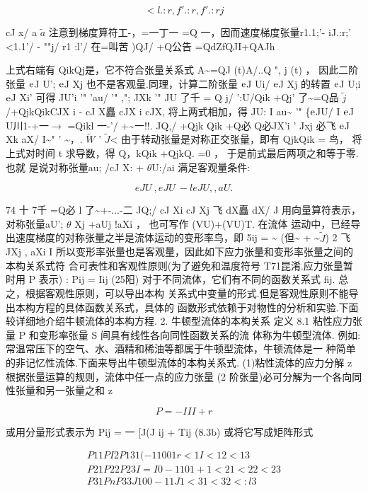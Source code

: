 \[<l.:r, f'.:r, f'.:rj\]

cJ x/ a $\tilde{a}$ 注意到梯度算符工-，=一丁一 =Q 一，因而速度梯度张量r1.1;'- iJ.:r;' <1.1'/ - ""j/ r1 :l'/ 在=叫苦 )QJ/ +Q公告 =QdZfQJI+QAJh

上式右端有 QikQj是，它不符合张量关系式 A\textasciitilde{}=QJ (t)A/..Q ", j (t) ， 因此二阶张量 ${\rm e}$J U'; ${\rm e}$J Xj 也不是客观量.同理，计算二阶张量 ${\rm e}$J Ui/ ${\rm e}$J Xj 的转置 ${\rm e}$J U;i${\rm e}$J Xi' 可得 JU'i '" 'au/ '" ,"; JXk '" JU 了千 = Q j/ ':U/Qik +Qj' 了\textasciitilde{}=Q品 $\tilde{j}$/+QjkQikCJX i - cJ X矗 cJX i cJX, 将上两式相加，得 JU: I au\textasciitilde{} '" \{${\rm e}$JU/ I ${\rm e}$J U川1-+一$\rightarrow$ =Qikl 一-'/ +\textasciitilde{}一!!. JQ,/ +Qjk Qik +Q必 Q必JX'i ' Jxj 必飞 ${\rm e}$J Xk aX/ I\textasciitilde{}" ' \textasciitilde{}，. $\tilde{W}$ ' $\tilde{J}$< 由于转动张量是对称正交张量，即有 QjkQik = 鸟， 将上式对时间 t 求导数，得 Q，kQik +QjkQ. =0 ， 于是前式最后两项之和等于零.也就 是说对称张量au; /cJ X: + $\theta$U:/ai 满足客观量条件:

\[eJ U~ , eJ U~ - l eJU , , aU.  \]

74 十 7千 =Q必 l 了\textasciitilde{}+-...-二 JQ;/ cJ Xi cJ Xj 飞 dX矗 dX/ J 用向量算符表示，对称张量aU'; $\theta$ Xj +aUj !aXi ， 也可写作 (VU)+(VU)T. 在流体 运动中，已经导出速度梯度的对称张量之半是流体运动的变形率鸟，即 5ij = \textasciitilde{} (但\textasciitilde{} + \textasciitilde{}$\tilde{J}$) 2 飞 JXj , aXi I 所以变形率张量也是客观量，因此如下应力张量和变形率张量之间的本构关系式符 合可表性和客观性原则(为了避免和温度符号 T71昆淆.应力张量暂时用 P 表示) : Pij = Iij (25阳) 对于不同流体，它们有不同的函数关系式 fij. 总之，根据客观性原则，可以导出本构 关系式中变量的形式.但是客观性原则不能导出本构方程的具体函数关系式，具体的 函数形式依赖于对物性的分析和实验.下面较详细地介绍牛顿流体的本构方程. 2. 牛顿型流体的本构关系 定义 8.1 粘性应力张量 P 和变形率张量 S 间具有线性各向同性函数关系的流 体称为牛顿型流体. 例如:常温常压下的空气、水、酒精和稀油等都属于牛顿型流体，牛顿流体是一 种简单的非记忆性流体.下面来导出牛顿型流体的本构关系式. (1)粘性流体的应力分解 z 根据张量运算的规则，流体中任一点的应力张量 (2 阶张量)必可分解为一个各向同性张量和另一张量之和 z

\begin{equation*}P =- III +r\tag{8.3a}\end{equation*}

或用分量形式表示为 Pij = 一 [J(J ij + Tij (8.3b) 或将它写成矩阵形式

\begin{gather*}
P 11 P I2 P 13 1 (-11 0 0 1 r<1I <1 2 <13\\
P21 P22 P23 I = I 0 - 11 0 1+ 1<21 <22 <23\\
P 31 P n P 33 J 1 0 0 - 11 J 1 <31 <32 < :l3
\end{gather*}


